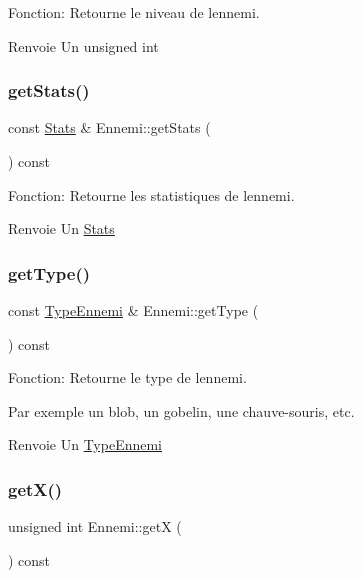 Fonction\+: Retourne le niveau de l\textquotesingle{}ennemi. 

\begin{DoxyReturn}{Renvoie}
Un unsigned int 
\end{DoxyReturn}
\mbox{\label{classEnnemi_a6d8d8be2e6e98b036d7256ec733190ba}} 
\subsubsection{\texorpdfstring{get\+Stats()}{getStats()}}
{\footnotesize\ttfamily const \mbox{\hyperlink{structStats}{Stats}} \& Ennemi\+::get\+Stats (\begin{DoxyParamCaption}{ }\end{DoxyParamCaption}) const}



Fonction\+: Retourne les statistiques de l\textquotesingle{}ennemi. 

\begin{DoxyReturn}{Renvoie}
Un \mbox{\hyperlink{structStats}{Stats}} 
\end{DoxyReturn}
\mbox{\label{classEnnemi_ac11c0baf4e19f8359da983360f1d6766}} 
\subsubsection{\texorpdfstring{get\+Type()}{getType()}}
{\footnotesize\ttfamily const \mbox{\hyperlink{structTypeEnnemi}{Type\+Ennemi}} \& Ennemi\+::get\+Type (\begin{DoxyParamCaption}{ }\end{DoxyParamCaption}) const}



Fonction\+: Retourne le type de l\textquotesingle{}ennemi. 

Par exemple un blob, un gobelin, une chauve-\/souris, etc. \begin{DoxyReturn}{Renvoie}
Un \mbox{\hyperlink{structTypeEnnemi}{Type\+Ennemi}} 
\end{DoxyReturn}
\mbox{\label{classEnnemi_a7d6bedb6cf6b7564816a9957812e5b67}} 
\subsubsection{\texorpdfstring{get\+X()}{getX()}}
{\footnotesize\ttfamily unsigned int Ennemi\+::getX (\begin{DoxyParamCaption}{ }\end{DoxyParamCaption}) const}




